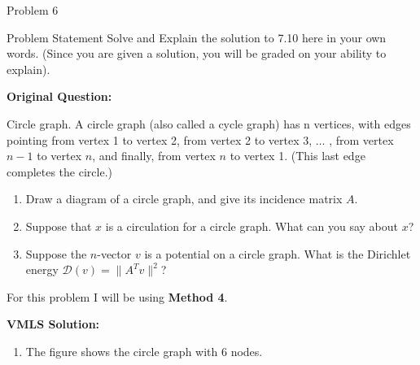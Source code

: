 \begin{problem}{Problem 6}
    \begin{statement}{Problem Statement}
        Solve and Explain the solution to 7.10 here in your own words. (Since you are given a solution, you will be graded on your ability to explain). \vspace*{1em}

        \noindent \textbf{Original Question:} \vspace*{1em}

        Circle graph. A circle graph (also called a cycle graph) has n vertices, with edges pointing from vertex 1 to vertex 2, from vertex 2 to vertex 3, $\dots$ , from vertex $n - 1$ to vertex $n$, and finally, from 
        vertex $n$ to vertex 1. (This last edge completes the circle.)

        \begin{enumerate}[label = (\alph*)]
            \item Draw a diagram of a circle graph, and give its incidence matrix $A$.
            \item Suppose that $x$ is a circulation for a circle graph. What can you say about $x$?
            \item Suppose the $n$-vector $v$ is a potential on a circle graph. What is the Dirichlet energy $\mathcal{D}(v) = \|A^{T}v\|^{2}$?
        \end{enumerate}
    \end{statement}

    \begin{Highlight}
        For this problem I will be using \textbf{Method 4}. \vspace*{1em}

        \noindent \textbf{VMLS Solution:} 

        \begin{enumerate}[label = (\alph*)]
            \item The figure shows the circle graph with 6 nodes.
            \begin{center}
\end{center}
\end{enumerate}
\end{Highlight}
\end{problem}
